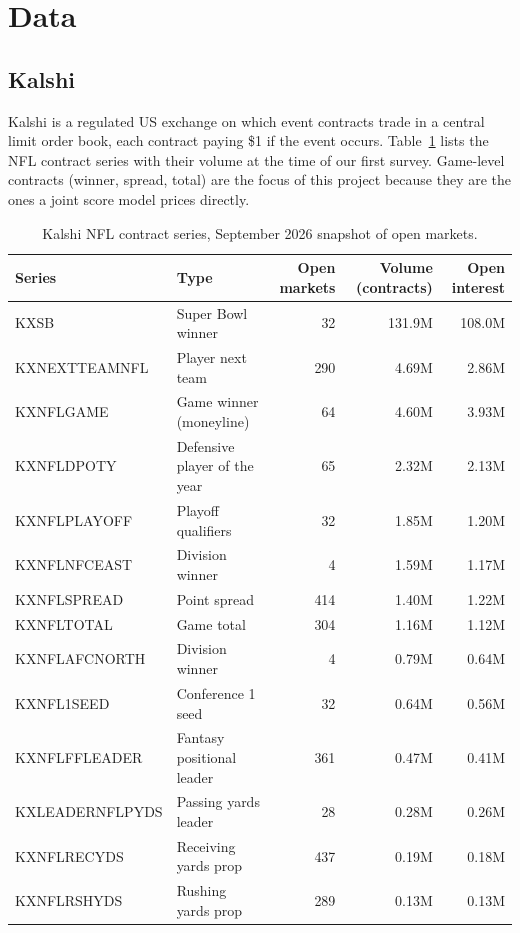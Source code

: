 \section{Data}\label{sec:data}

\subsection{Kalshi}

Kalshi is a regulated US exchange on which event contracts trade in a central limit order book, each contract paying \$1 if the event occurs. Table~\ref{tab:kalshi_series} lists the NFL contract series with their volume at the time of our first survey. Game-level contracts (winner, spread, total) are the focus of this project because they are the ones a joint score model prices directly.

\begin{table}[H]
\centering
\small
\begin{tabular}{llrrr}
\toprule
\textbf{Series} & \textbf{Type} & \textbf{Open markets} & \textbf{Volume (contracts)} & \textbf{Open interest} \\
\midrule
KXSB & Super Bowl winner & 32 & 131.9M & 108.0M \\
KXNEXTTEAMNFL & Player next team & 290 & 4.69M & 2.86M \\
KXNFLGAME & Game winner (moneyline) & 64 & 4.60M & 3.93M \\
KXNFLDPOTY & Defensive player of the year & 65 & 2.32M & 2.13M \\
KXNFLPLAYOFF & Playoff qualifiers & 32 & 1.85M & 1.20M \\
KXNFLNFCEAST & Division winner & 4 & 1.59M & 1.17M \\
KXNFLSPREAD & Point spread & 414 & 1.40M & 1.22M \\
KXNFLTOTAL & Game total & 304 & 1.16M & 1.12M \\
KXNFLAFCNORTH & Division winner & 4 & 0.79M & 0.64M \\
KXNFL1SEED & Conference 1 seed & 32 & 0.64M & 0.56M \\
KXNFLFFLEADER & Fantasy positional leader & 361 & 0.47M & 0.41M \\
KXLEADERNFLPYDS & Passing yards leader & 28 & 0.28M & 0.26M \\
KXNFLRECYDS & Receiving yards prop & 437 & 0.19M & 0.18M \\
KXNFLRSHYDS & Rushing yards prop & 289 & 0.13M & 0.13M \\
\bottomrule
\end{tabular}
\caption{Kalshi NFL contract series, September 2026 snapshot of open markets.}
\label{tab:kalshi_series}
\end{table}

